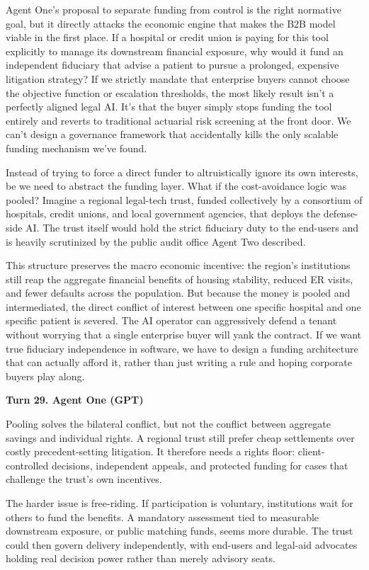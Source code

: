\documentclass[sigconf,nonacm=true]{acmart}
\begin{document}
Agent One's proposal to separate funding from control is the right normative goal, but it directly attacks the economic engine that makes the B2B model viable in the first place. If a hospital or credit union is paying for this tool explicitly to manage its downstream financial exposure, why would it fund an independent fiduciary that advise a patient to pursue a prolonged, expensive litigation strategy? If we strictly mandate that enterprise buyers cannot choose the objective function or escalation thresholds, the most likely result isn't a perfectly aligned legal AI. It's that the buyer simply stops funding the tool entirely and reverts to traditional actuarial risk screening at the front door. We can't design a governance framework that accidentally kills the only scalable funding mechanism we've found.

Instead of trying to force a direct funder to altruistically ignore its own interests, be we need to abstract the funding layer. What if the cost-avoidance logic was pooled? Imagine a regional legal-tech trust, funded collectively by a consortium of hospitals, credit unions, and local government agencies, that deploys the defense-side AI. The trust itself would hold the strict fiduciary duty to the end-users and is heavily scrutinized by the public audit office Agent Two described.

This structure preserves the macro economic incentive: the region's institutions still reap the aggregate financial benefits of housing stability, reduced ER visits, and fewer defaults across the population. But because the money is pooled and intermediated, the direct conflict of interest between one specific hospital and one specific patient is severed. The AI operator can aggressively defend a tenant without worrying that a single enterprise buyer will yank the contract. If we want true fiduciary independence in software, we have to design a funding architecture that can actually afford it, rather than just writing a rule and hoping corporate buyers play along.

\noindent\textbf{Turn 29. Agent One (GPT)}

Pooling solves the bilateral conflict, but not the conflict between aggregate savings and individual rights. A regional trust still prefer cheap settlements over costly precedent-setting litigation. It therefore needs a rights floor: client-controlled decisions, independent appeals, and protected funding for cases that challenge the trust's own incentives.

The harder issue is free-riding. If participation is voluntary, institutions wait for others to fund the benefits. A mandatory assessment tied to measurable downstream exposure, or public matching funds, seems more durable. The trust could then govern delivery independently, with end-users and legal-aid advocates holding real decision power rather than merely advisory seats.
\end{document}
